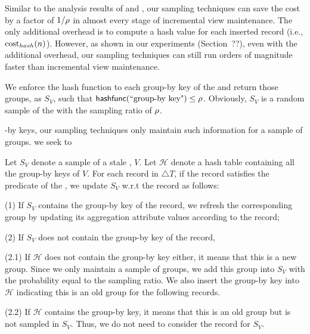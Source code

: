Similar to the analysis results of \spview and \fjview, our sampling techniques can save the cost by a factor of $1/\rho $ in almost every stage of incremental view maintenance. The only additional overhead is to compute a hash value for each inserted record (i.e., $\textrm{cost}_{hash}(n)$). However, as shown in our experiments (Section~??), even with the additional overhead, our sampling techniques can still run orders of magnitude faster than incremental view maintenance. %

\iffalse
We enforce the hash function to each group-by key of the \aggview and return those groups, as $S_{V}$, such that $\textsf{hashfunc}(\textrm{``group-by key"}) \leq \rho $. Obviously, $S_{V}$ is a random sample of the \aggview with the sampling ratio of $\rho $. 

-by keys, our sampling techniques only maintain such information for a sample of groups. we seek to 


 

Let $S_{V}$ denote a sample of a stale \aggview, $V$. Let $\mathcal{H}$ denote a hash table containing all the group-by keys of $V$. For each record in $\triangle T$, if the record satisfies the predicate of the \aggview, we update $S_{V}$ w.r.t the record as follows: 
\vspace{.25em}

(1) If $S_{V}$ contains the group-by key of the record, we refresh the corresponding group by updating its aggregation attribute values according to the record;

\vspace{.25em}

(2) If $S_{V}$ does not contain the group-by key of the record,

\vspace{.25em}

(2.1) If $\mathcal{H}$ does not contain the group-by key either, it means that this is a new group. Since we only maintain a sample of groups, we add this group into $S_{V}$ with the probability equal to the sampling ratio. We also insert the group-by key into $\mathcal{H}$ indicating this is an old group for the following records.

\vspace{.25em}

(2.2) If $\mathcal{H}$ contains the group-by key, it means that this is an old group but is not sampled in $S_{V}$. Thus, we do not need to consider the record for $S_{V}$.




